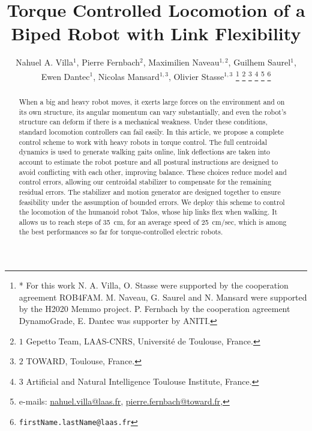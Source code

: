 \documentclass[letterpaper, 10 pt, conference]{ieeeconf}  %
\title{\LARGE \bf
Torque Controlled Locomotion of a Biped Robot with Link Flexibility
}
\author{Nahuel A. Villa$^1$, Pierre Fernbach$^2$, Maximilien Naveau$^{1,2}$, Guilhem Saurel$^1$,\\ Ewen Dantec$^1$, Nicolas Mansard$^{1,3}$, Olivier Stasse$^{1,3}$%
\thanks{* For this work N. A. Villa, O. Stasse were supported by the cooperation agreement ROB4FAM. M. Naveau, G. Saurel and N. Mansard were supported by the H2020 Memmo project. P. Fernbach by the cooperation agreement DynamoGrade, E. Dantec was supporter by ANITI.}%
\thanks{$1$ Gepetto Team, LAAS-CNRS, Université de Toulouse, France.}
\thanks{$2$ TOWARD, Toulouse, France.}
\thanks{$3$ Artificial and Natural Intelligence Toulouse Institute, France.}%
\thanks{e-mails: \href{mailto:nahuel.villa@laas.fr}{nahuel.villa@laas.fr},\;\; \href{mailto:pierre.fernbach@toward.fr}{pierre.fernbach@toward.fr},}%
\thanks{\hspace{10mm}\texttt{firstName.lastName@laas.fr}}%
}
\begin{document}
\maketitle
\thispagestyle{empty}
\pagestyle{empty}


\begin{abstract}


When a big and heavy robot moves, it exerts large forces on the environment and on its own structure, its angular momentum can vary
substantially, and even the robot's structure can deform if there is a mechanical weakness. Under these conditions, standard locomotion controllers can fail easily. 
In this article, we propose a complete control scheme to work with heavy robots in torque control. The full centroidal dynamics is used to generate walking gaits online, link deflections are taken into account to estimate the robot posture and all postural instructions are designed to avoid conflicting with each other, improving balance. These choices reduce model and control errors, allowing our centroidal stabilizer to compensate for the remaining residual errors. The stabilizer and motion generator are designed together to ensure feasibility under the assumption of bounded errors.
We deploy this scheme to control the locomotion of the humanoid robot Talos, whose hip links flex when walking.
It allows us to reach steps of 35~cm, for an average speed of 25~cm/sec, which is among the best performances so far for torque-controlled electric robots.





\end{abstract}
\end{document}
